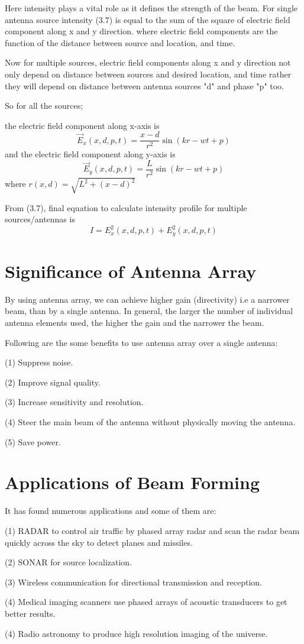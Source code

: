 Here intensity plays a vital role as it defines the strength of the beam. For single antenna source intensity (3.7) is equal to the sum of the square of electric field component along x and y direction. where electric field components are the function of the distance between source and location, and time.

Now for multiple sources, electric field components along x and y direction not only depend on distance between sources and desired location, and time rather they will depend on distance between antenna sources "d" and phase "p" too.

So for all the sources;

the electric field component along x-axis is
\begin{equation}
\vec{E}_x(x,d,p,t) = \frac{x-d}{r^2}\sin(kr-wt+p)
\end{equation}
and the electric field component along y-axis is
\begin{equation}
\vec{E}_y(x,d,p,t) = \frac{L}{r^2}\sin(kr-wt+p)
\end{equation}
where $r(x,d) = \sqrt{L^2+(x-d)^2}$ 

From (3.7), final equation to calculate intensity profile for multiple sources/antennas is
\begin{equation}
I = E_x^2(x,d,p,t)+E_y^2(x,d,p,t)
\end{equation}

\section{Significance of Antenna Array}

By using antenna array, we can achieve higher gain (directivity) i.e a narrower beam, than by a single antenna. In general, the larger the number of individual antenna elements used, the higher the gain and the narrower the beam.

Following are the some benefits to use antenna array over a single antenna:

(1) Suppress noise.

(2) Improve signal quality.

(3) Increase sensitivity and resolution.

(4) Steer the main beam of the antenna without physically moving the antenna.

(5) Save power.

\section{Applications of Beam Forming}

It has found numerous applications and some of them are:

(1) RADAR to control air traffic by phased array radar and scan the radar beam quickly across the sky to detect planes and missiles.

(2) SONAR for source localization.

(3) Wireless communication for directional transmission and reception.

(4) Medical imaging scanners use phased arrays of acoustic transducers to get better results.

(4) Radio astronomy to produce high resolution imaging of the universe. 
